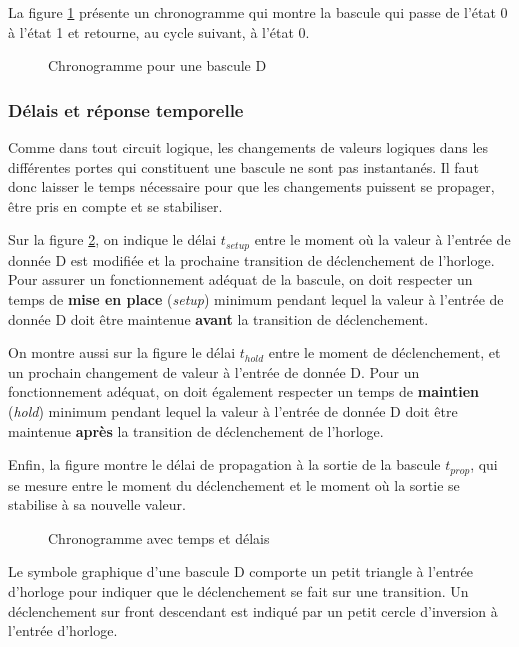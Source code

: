 \documentclass[11pt]{article}
\begin{document}
La figure \ref{fig:org969edf2} présente un chronogramme qui montre la bascule
qui passe de l'état 0 à l'état 1 et retourne, au cycle suivant, à
l'état 0.

\begin{figure}[htbp]
\centering

\caption{\label{fig:org969edf2}Chronogramme pour une bascule D}
\end{figure}

\subsubsection{Délais et réponse temporelle}
\label{sec:orga60acd5}

Comme dans tout circuit logique, les changements de valeurs logiques
dans les différentes portes qui constituent une bascule ne sont pas
instantanés. Il faut donc laisser le temps nécessaire pour que les
changements puissent se propager, être pris en compte et se stabiliser.

Sur la figure \ref{fig:org518f0f5}, on indique le délai \(t_{setup}\) entre le
moment où la valeur à l'entrée de donnée D est modifiée et la
prochaine transition de déclenchement de l'horloge. Pour assurer un
fonctionnement adéquat de la bascule, on doit respecter un temps de
\textbf{mise en place} (\emph{setup}) minimum pendant lequel la valeur à l'entrée
de donnée D doit être maintenue \textbf{avant} la transition de
déclenchement.

On montre aussi sur la figure le délai \(t_{hold}\) entre le moment de
déclenchement, et un prochain changement de valeur à l'entrée de
donnée D. Pour un fonctionnement adéquat, on doit également respecter
un temps de \textbf{maintien} (\emph{hold}) minimum pendant lequel la valeur à
l'entrée de donnée D doit être maintenue \textbf{après} la transition de
déclenchement de l'horloge.

Enfin, la figure montre le délai de propagation à la sortie de la
bascule \(t_{prop}\), qui se mesure entre le moment du déclenchement et
le moment où la sortie se stabilise à sa nouvelle valeur.

\begin{figure}[htbp]
\centering

\caption{\label{fig:org518f0f5}Chronogramme avec temps et délais}
\end{figure}

Le symbole graphique d'une bascule D comporte un petit triangle à
l'entrée d'horloge pour indiquer que le déclenchement se fait sur une
transition. Un déclenchement sur front descendant est indiqué par un
petit cercle d'inversion à l'entrée d'horloge.
\end{document}
